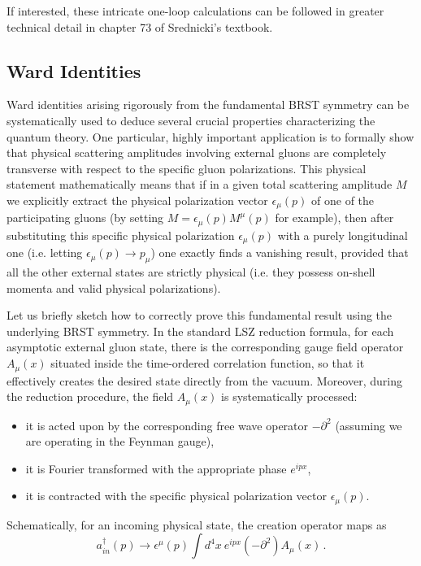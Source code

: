 If interested, these intricate one-loop calculations can be followed in greater technical detail in chapter 73 of Srednicki's textbook.

\subsection{Ward Identities}

Ward identities arising rigorously from the fundamental BRST symmetry can be systematically used to deduce several crucial properties characterizing the quantum theory. One particular, highly important application is to formally show that physical scattering amplitudes involving external gluons are completely transverse with respect to the specific gluon polarizations. This physical statement mathematically means that if in a given total scattering amplitude \(M\) we explicitly extract the physical polarization vector \(\epsilon_\mu(p)\) of one of the participating gluons (by setting \(M = \epsilon_\mu(p)M^\mu(p)\) for example), then after substituting this specific physical polarization \(\epsilon_\mu(p)\) with a purely longitudinal one (i.e. letting \(\epsilon_\mu(p) \rightarrow p_\mu\)) one exactly finds a vanishing result, provided that all the other external states are strictly physical (i.e. they possess on-shell momenta and valid physical polarizations).

Let us briefly sketch how to correctly prove this fundamental result using the underlying BRST symmetry. In the standard LSZ reduction formula, for each asymptotic external gluon state, there is the corresponding gauge field operator \(A_\mu(x)\) situated inside the time-ordered correlation function, so that it effectively creates the desired state directly from the vacuum. Moreover, during the reduction procedure, the field \(A_\mu(x)\) is systematically processed:
\begin{itemize}
    \item[(i)] it is acted upon by the corresponding free wave operator \(-\partial^2\) (assuming we are operating in the Feynman gauge),
    \item[(ii)] it is Fourier transformed with the appropriate phase \(e^{ipx}\),
    \item[(iii)] it is contracted with the specific physical polarization vector \(\epsilon_\mu(p)\).
\end{itemize}

Schematically, for an incoming physical state, the creation operator maps as
\begin{equation} \label{eq:lsz_incoming}
    a_{in}^\dagger(p) \rightarrow \epsilon^\mu(p) \int d^4x \ e^{ipx}(-\partial^2)A_\mu(x) \, .
\end{equation}

